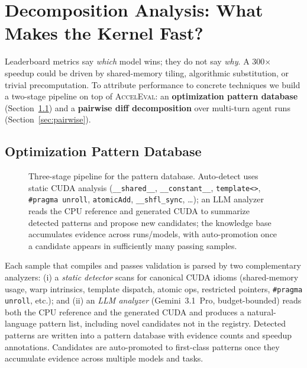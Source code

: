 \documentclass{article}
\begin{document}
\section{Decomposition Analysis: What Makes the Kernel Fast?}
\label{sec:decomp}

Leaderboard metrics say \emph{which} model wins; they do not say \emph{why}. A 300$\times$ speedup could be driven by shared-memory tiling, algorithmic substitution, or trivial precomputation. To attribute performance to concrete techniques we build a two-stage pipeline on top of \textsc{AccelEval}: an \textbf{optimization pattern database} (Section~\ref{sec:pat-db}) and a \textbf{pairwise diff decomposition} over multi-turn agent runs (Section~\ref{sec:pairwise}).

\subsection{Optimization Pattern Database}
\label{sec:pat-db}

\begin{figure}[ht]
\centering
\caption{Three-stage pipeline for the pattern database. Auto-detect uses static CUDA analysis (\texttt{\_\_shared\_\_}, \texttt{\_\_constant\_\_}, \texttt{template<>}, \texttt{\#pragma unroll}, \texttt{atomicAdd}, \texttt{\_\_shfl\_sync}, \ldots); an LLM analyzer reads the CPU reference and generated CUDA to summarize detected patterns and propose new candidates; the knowledge base accumulates evidence across runs/models, with auto-promotion once a candidate appears in sufficiently many passing samples.}
\label{fig:patdb}
\end{figure}

Each sample that compiles and passes validation is parsed by two complementary analyzers:
(i) a \emph{static detector} scans for canonical CUDA idioms (shared-memory usage, warp intrinsics, template dispatch, atomic ops, restricted pointers, \texttt{\#pragma unroll}, etc.); and
(ii) an \emph{LLM analyzer} (Gemini~3.1~Pro, budget-bounded) reads both the CPU reference and the generated CUDA and produces a natural-language pattern list, including novel candidates not in the registry.
Detected patterns are written into a pattern database with evidence counts and speedup annotations. Candidates are auto-promoted to first-class patterns once they accumulate evidence across multiple models and tasks.
\end{document}
